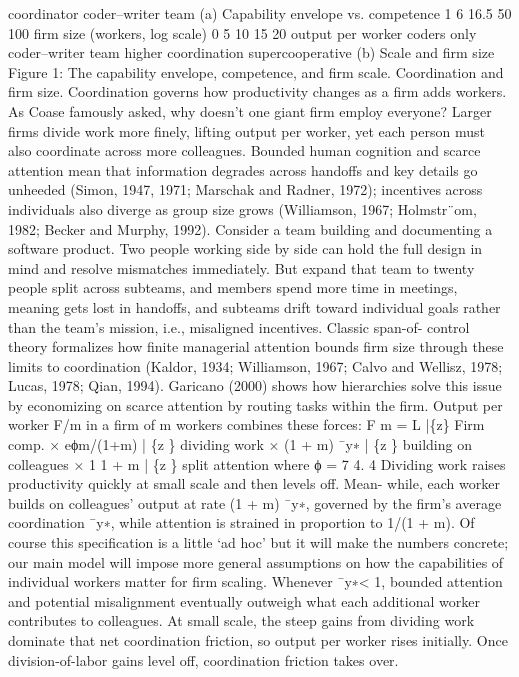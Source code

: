 coordinator
coder–writer team
(a) Capability envelope vs. competence
1
6
16.5
50
100
firm size (workers, log scale)
0
5
10
15
20
output per worker
coders only
coder–writer
team
higher
coordination
supercooperative
(b) Scale and firm size
Figure 1: The capability envelope, competence, and firm scale.
Coordination and firm size. Coordination governs how productivity changes as a firm
adds workers. As Coase famously asked, why doesn’t one giant firm employ everyone?
Larger firms divide work more finely, lifting output per worker, yet each person must
also coordinate across more colleagues. Bounded human cognition and scarce attention
mean that information degrades across handoffs and key details go unheeded (Simon,
1947, 1971; Marschak and Radner, 1972); incentives across individuals also diverge as
group size grows (Williamson, 1967; Holmstr¨om, 1982; Becker and Murphy, 1992).
Consider a team building and documenting a software product. Two people working
side by side can hold the full design in mind and resolve mismatches immediately. But
expand that team to twenty people split across subteams, and members spend more
time in meetings, meaning gets lost in handoffs, and subteams drift toward individual
goals rather than the team’s mission, i.e., misaligned incentives. Classic span-of-
control theory formalizes how finite managerial attention bounds firm size through
these limits to coordination (Kaldor, 1934; Williamson, 1967; Calvo and Wellisz, 1978;
Lucas, 1978; Qian, 1994). Garicano (2000) shows how hierarchies solve this issue by
economizing on scarce attention by routing tasks within the firm.
Output per worker F/m in a firm of m workers combines these forces:
F
m =
L
|\{z\}
Firm
comp.
× eϕm/(1+m)
|
\{z
\}
dividing work
× (1 + m) ¯y∗
|
\{z
\}
building on
colleagues
×
1
1 + m
| \{z \}
split
attention
where ϕ = 7
4.
4
Dividing work raises productivity quickly at small scale and then levels off. Mean-
while, each worker builds on colleagues’ output at rate (1 + m) ¯y∗, governed by the
firm’s average coordination ¯y∗, while attention is strained in proportion to 1/(1 + m).
Of course this specification is a little ‘ad hoc’ but it will make the numbers concrete;
our main model will impose more general assumptions on how the capabilities of
individual workers matter for firm scaling.
Whenever ¯y∗< 1, bounded attention and potential misalignment eventually outweigh
what each additional worker contributes to colleagues. At small scale, the steep gains
from dividing work dominate that net coordination friction, so output per worker
rises initially. Once division-of-labor gains level off, coordination friction takes over.
